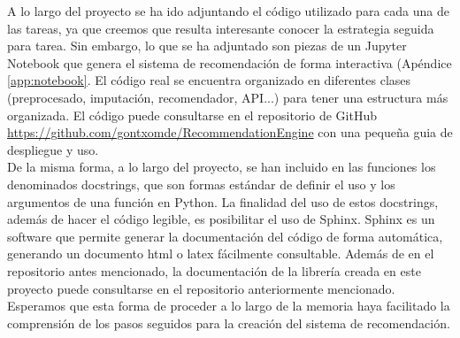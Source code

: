 A lo largo del proyecto se ha ido adjuntando el código utilizado para cada una de las tareas, ya que creemos que resulta interesante conocer la estrategia seguida para tarea. Sin embargo, lo que se ha adjuntado son piezas de un Jupyter Notebook que genera el sistema de recomendación de forma interactiva (Apéndice \ref{app:notebook}. El código real se encuentra organizado en diferentes clases (preprocesado, imputación, recomendador, API...) para tener una estructura más organizada. El código puede consultarse en el repositorio de GitHub \url{https://github.com/gontxomde/RecommendationEngine} con una pequeña guia de despliegue y uso.\\

De la misma forma, a lo largo del proyecto, se han incluido en las funciones los denominados docstrings, que son formas estándar de definir el uso y los argumentos de una función en Python. La finalidad del uso de estos docstrings, además de hacer el código legible, es posibilitar el uso de Sphinx. Sphinx es un software que permite generar la documentación del código de forma automática, generando un documento html o latex fácilmente consultable. Además de en el repositorio antes mencionado, la documentación de la librería creada en este proyecto puede consultarse en el repositorio anteriormente mencionado.\\

Esperamos que esta forma de proceder a lo largo de la memoria haya facilitado la comprensión de los pasos seguidos para la creación del sistema de recomendación.


